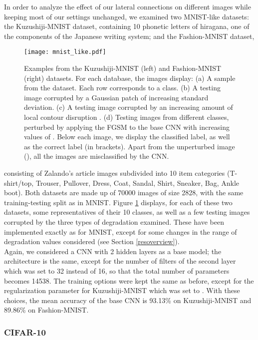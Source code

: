 \documentclass[11pt,oneside,reqno]{amsart}
\begin{document}
 In order to analyze the effect of our lateral connections on different images while keeping most of our settings unchanged, we examined two MNIST-like datasets: the Kuzushiji-MNIST dataset, containing 10 phonetic letters of hiragana, one of the components of the Japanese writing system; and the Fashion-MNIST dataset,  
 \begin{figure}[htbp!]
  \centering
 \texttt{[image: mnist\_like.pdf]}
 \caption{Examples from the Kuzushiji-MNIST (left) and Fashion-MNIST (right) datasets. For each database, the images display: (a) A sample from the dataset. Each row corresponds to a class. (b) A testing image corrupted by a Gaussian patch of increasing standard deviation. (c) A testing image corrupted by an increasing amount of local contour disruption . (d) Testing images from different classes, perturbed by applying the FGSM to the base CNN with increasing values of . Below each image, we display the classified label, as well as the correct label (in brackets). Apart from the unperturbed image (), all the images are misclassified by the CNN.}\label{mnist_like}
 \end{figure} 
 consisting of Zalando's article images subdivided into 10 item categories (T-shirt/top, Trouser, Pullover, Dress, Coat, Sandal, Shirt, Sneaker, Bag, Ankle boot). Both datasets are made up of 70000 images of size 2828, with the same training-testing split as in MNIST. Figure \ref{mnist_like} displays, for each of these two datasets, some representatives of their 10 classes, as well as a few testing images corrupted by the three types of degradation examined. These have been implemented exactly as for MNIST, except for some changes in the range of degradation values considered (see Section \ref{resoverview}).\\
 Again, we considered a CNN with 2 hidden layers as a base model; the architecture is the same, except for the number of filters of the second layer which was set to 32 instead of 16, so that the total number of parameters becomes 14538. The training options were kept the same as before, except for the  regularization parameter for Kuzushiji-MNIST which was set to . With these choices, the mean accuracy of the base CNN is 93.13\% on Kuzushiji-MNIST and 89.86\% on Fashion-MNIST.
 
 
 \subsubsection{CIFAR-10}
\end{document}
